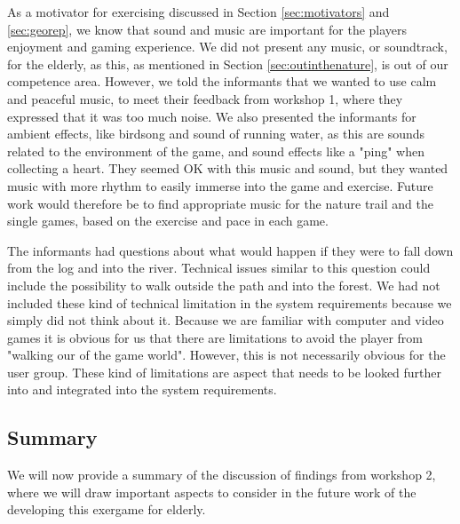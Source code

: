 As a motivator for exercising discussed in Section \ref{sec:motivators} and \ref{sec:georep}, we know that sound and music are important for the players enjoyment and gaming experience. We did not present any music, or soundtrack, for the elderly, as this, as mentioned in Section \ref{sec:outinthenature}, is out of our competence area. However, we told the informants that we wanted to use calm and peaceful music, to meet their feedback from workshop 1, where they expressed that it was too much noise. We also presented the informants for ambient effects, like birdsong and sound of running water, as this are sounds related to the environment of the game, and sound effects like a "ping" when collecting a heart. They seemed OK with this music and sound, but they wanted music with more rhythm to easily immerse into the game and exercise. Future work would therefore be to find appropriate music for the nature trail and the single games, based on the exercise and pace in each game. 

The informants had questions about what would happen if they were to fall down from the log and into the river. Technical issues similar to this question could include the possibility to walk outside the path and into the forest. We had not included these kind of technical limitation in the system requirements because we simply did not think about it. Because we are familiar with computer and video games it is obvious for us that there are limitations to avoid the player from "walking our of the game world". However, this is not necessarily obvious for the user group. These kind of limitations are aspect that needs to be looked further into and integrated into the system requirements.

\subsection{Summary}
\label{sec:summarydiscW2}
We will now provide a summary of the discussion of findings from workshop 2, where we will draw important aspects to consider in the future work of the developing this exergame for elderly. 

